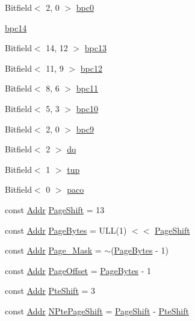 \begin{DoxyCompactItemize}
\item 
Bitfield$<$ 2, 0 $>$ \hyperlink{namespaceMipsISA_a4c091f053afee95b41f1856d1da133b9}{bpc0}
\item 
\hyperlink{namespaceMipsISA_a1806cb70ccc6d59cc1c121577e865ca0}{bpc14}
\item 
Bitfield$<$ 14, 12 $>$ \hyperlink{namespaceMipsISA_a7cf0cea0a6b278c939eb38734106c1a1}{bpc13}
\item 
Bitfield$<$ 11, 9 $>$ \hyperlink{namespaceMipsISA_a313ed0dc7e6d48dd58ab9db30a3ef8ef}{bpc12}
\item 
Bitfield$<$ 8, 6 $>$ \hyperlink{namespaceMipsISA_ae6a271f86b236430cfa0413a0c8d9e50}{bpc11}
\item 
Bitfield$<$ 5, 3 $>$ \hyperlink{namespaceMipsISA_a0cb92f59eb4b244ed607469b987321e0}{bpc10}
\item 
Bitfield$<$ 2, 0 $>$ \hyperlink{namespaceMipsISA_af89b5967055cc9764e7cd09e64a928a0}{bpc9}
\item 
Bitfield$<$ 2 $>$ \hyperlink{namespaceMipsISA_ac68f02a27ac5b77c4c280489f991c32b}{dq}
\item 
Bitfield$<$ 1 $>$ \hyperlink{namespaceMipsISA_a03a5e2158a849bce2f5bbef022f4b9e0}{tup}
\item 
Bitfield$<$ 0 $>$ \hyperlink{namespaceMipsISA_a730eba39b1e25cb11460a3f90f49aa15}{paco}
\item 
const \hyperlink{classm5_1_1params_1_1Addr}{Addr} \hyperlink{namespaceMipsISA_a6eacddc1d6d191380d9afdac5920ea48}{PageShift} = 13
\item 
const \hyperlink{classm5_1_1params_1_1Addr}{Addr} \hyperlink{namespaceMipsISA_ad9d6a4d965e107c9a7214f096107296b}{PageBytes} = ULL(1) $<$$<$ \hyperlink{namespaceMipsISA_a6eacddc1d6d191380d9afdac5920ea48}{PageShift}
\item 
const \hyperlink{classm5_1_1params_1_1Addr}{Addr} \hyperlink{namespaceMipsISA_ac2d47d845cf48dbc176f717bb7d50a7f}{Page\_\-Mask} = $\sim$(\hyperlink{namespaceMipsISA_ad9d6a4d965e107c9a7214f096107296b}{PageBytes} -\/ 1)
\item 
const \hyperlink{classm5_1_1params_1_1Addr}{Addr} \hyperlink{namespaceMipsISA_a51e1064f1269394dc26702651be5061f}{PageOffset} = \hyperlink{namespaceMipsISA_ad9d6a4d965e107c9a7214f096107296b}{PageBytes} -\/ 1
\item 
const \hyperlink{classm5_1_1params_1_1Addr}{Addr} \hyperlink{namespaceMipsISA_af2c06ba3a5eb15cdac25d21b735b7161}{PteShift} = 3
\item 
const \hyperlink{classm5_1_1params_1_1Addr}{Addr} \hyperlink{namespaceMipsISA_a9f060ccda225dfb28dff712695adab46}{NPtePageShift} = \hyperlink{namespaceMipsISA_a6eacddc1d6d191380d9afdac5920ea48}{PageShift} -\/ \hyperlink{namespaceMipsISA_af2c06ba3a5eb15cdac25d21b735b7161}{PteShift}
$$
\end{DoxyCompactItemize}
